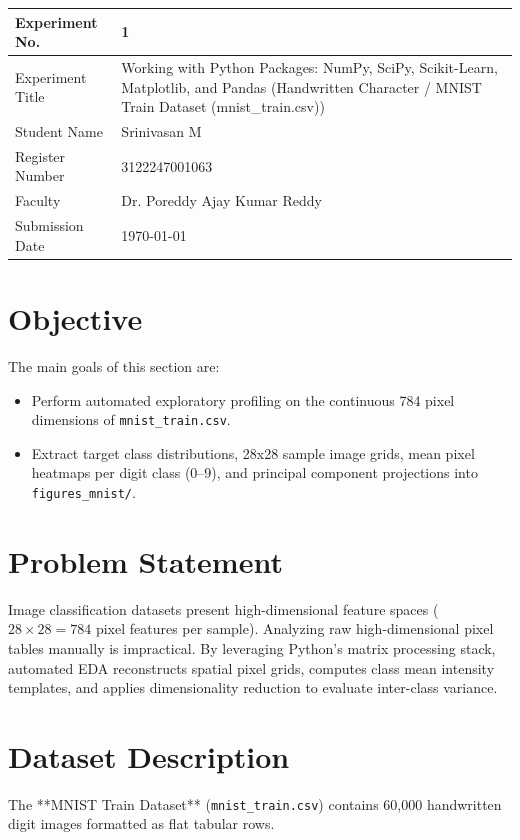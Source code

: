 \documentclass[12pt,a4paper]{article}
\begin{document}
\begin{tabular}{|p{4cm}|p{11cm}|}
\hline
Experiment No. & 1 \\ \hline
Experiment Title & Working with Python Packages: NumPy, SciPy, Scikit-Learn, Matplotlib, and Pandas (Handwritten Character / MNIST Train Dataset (mnist\_train.csv)) \\ \hline
Student Name & Srinivasan M \\ \hline
Register Number & 3122247001063 \\ \hline
Faculty & Dr. Poreddy Ajay Kumar Reddy \\ \hline
Submission Date & \today \\ \hline
\end{tabular}

\vspace{0.3cm}

\section{Objective}
The main goals of this section are:
\begin{itemize}[noitemsep]
    \item Perform automated exploratory profiling on the continuous 784 pixel dimensions of \texttt{mnist\_train.csv}.
    \item Extract target class distributions, 28x28 sample image grids, mean pixel heatmaps per digit class (0--9), and principal component projections into \texttt{figures\_mnist/}.
\end{itemize}

\section{Problem Statement}
Image classification datasets present high-dimensional feature spaces ($28 \times 28 = 784$ pixel features per sample). Analyzing raw high-dimensional pixel tables manually is impractical. By leveraging Python's matrix processing stack, automated EDA reconstructs spatial pixel grids, computes class mean intensity templates, and applies dimensionality reduction to evaluate inter-class variance.

\section{Dataset Description}
The **MNIST Train Dataset** (\texttt{mnist\_train.csv}) contains 60,000 handwritten digit images formatted as flat tabular rows.
\end{document}
